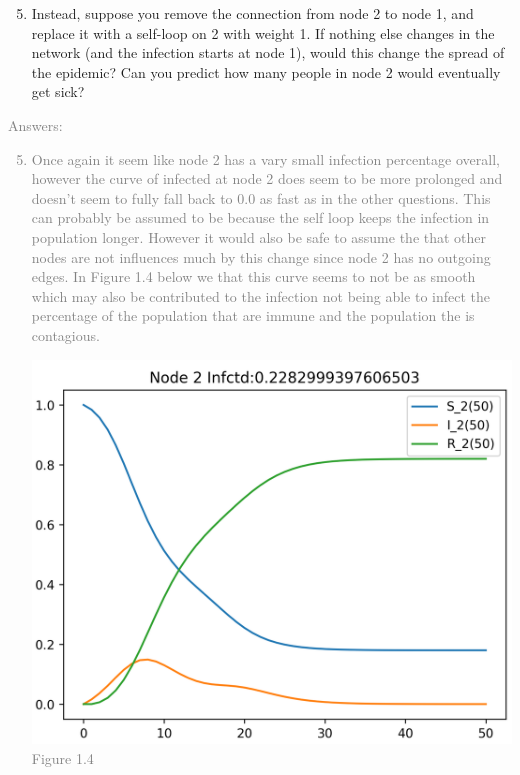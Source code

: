 \documentclass[11pt]{article}
\begin{document}
\begin{enumerate}
	\setcounter{enumi}{4}
	\item Instead, suppose you remove the connection from node 2 to node 1, and replace it with a self-loop on 2 with weight 1. If nothing else changes in the network (and the infection starts at node 1), would this change the spread of the epidemic? Can you predict how many people in node 2 would eventually get sick?
\end{enumerate}
\textcolor{gray}{
Answers:
\begin{enumerate}
	\setcounter{enumi}{4}
	\item Once again it seem like node 2 has a vary small infection percentage overall, however the curve of infected at node 2 does seem to be more prolonged and doesn't seem to fully fall back to 0.0 as fast as in the other questions.  This can probably be assumed to be because the self loop keeps the infection in population longer.  However it would also be safe to assume the that other nodes are not influences much by this change since node 2 has no outgoing edges. In Figure 1.4 below we that this curve seems to not be as smooth which may also be contributed to the infection not being able to infect the percentage of the population that are immune and the population the is contagious.
\begin{center}
	\includegraphics[scale=0.8]{Figure1.4}\\
	Figure 1.4
\end{center}
\end{enumerate}
}
\end{document}
